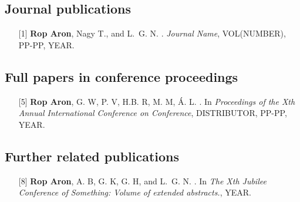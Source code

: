 {}

\vspace*{2em}

\subsection*{Journal publications}

\vspace*{1em}

\begin{enumerate}

\item [{[1]}] \textbf{Rop Aron}, Nagy T., and L.~G. N.
.
\newblock \emph{Journal Name}, VOL(NUMBER), PP-PP, YEAR.

\end{enumerate}

\subsection*{Full papers in conference proceedings}
\vspace*{1em}

\begin{enumerate}
\item [{[5]}] \textbf{Rop Aron}, G. W, P. V, H.B. R, M. M, Á. L.
.
\newblock In \emph{Proceedings of the Xth Annual International Conference on Conference}, DISTRIBUTOR, PP-PP, YEAR.
\end{enumerate}

\subsection*{Further related publications}
\vspace*{1em}

\begin{enumerate}

\item [{[8]}] \textbf{Rop Aron}, A. B, G. K, G. H, and L.~G. N.
.
\newblock In \emph{The Xth Jubilee Conference of Something: Volume of extended abstracts.}, YEAR.

\end{enumerate}